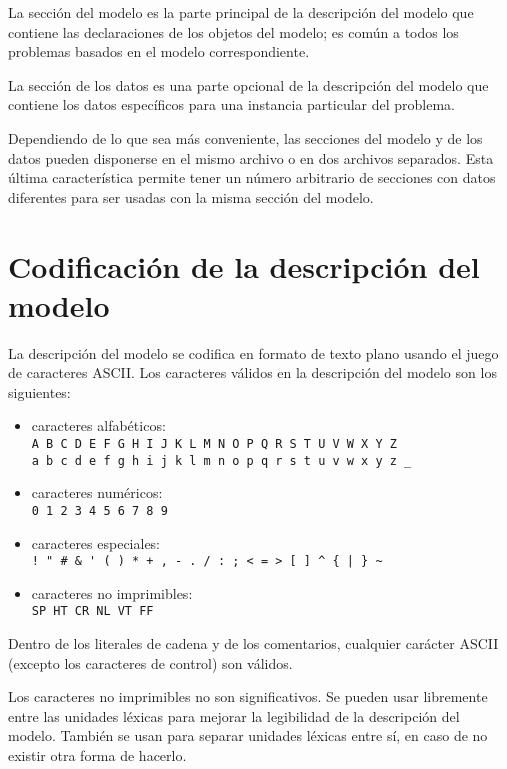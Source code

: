 \documentclass[11pt,spanish]{report}
\begin{document}
La sección del modelo es la parte principal de la descripción del modelo que contiene las declaraciones de los objetos del modelo; es común a todos los problemas basados en el modelo correspondiente.

La sección de los datos es una parte opcional de la descripción del modelo que contiene los datos específicos para una instancia particular del problema.

Dependiendo de lo que sea más conveniente, las secciones del modelo y de los datos pueden disponerse en el mismo archivo o en dos archivos separados. Esta última característica permite tener un número arbitrario de secciones con datos diferentes para ser usadas con la misma sección del modelo.


\newpage

\chapter{Codificación de la descripción del modelo}
\label{coding}

La descripción del modelo se codifica en formato de texto plano usando el juego de caracteres ASCII. Los caracteres válidos en la descripción del modelo son los siguientes:

\begin{itemize}
\item caracteres alfabéticos:\\
\verb|A B C D E F G H I J K L M N O P Q R S T U V W X Y Z|\\
\verb|a b c d e f g h i j k l m n o p q r s t u v w x y z _|
\item caracteres numéricos:\\
\verb|0 1 2 3 4 5 6 7 8 9|
\item caracteres especiales:\\
\verb?! " # & ' ( ) * + , - . / : ; < = > [ ] ^ { | } ~?
\item caracteres no imprimibles:\\
\verb|SP HT CR NL VT FF|
\end{itemize}

Dentro de los literales de cadena y de los comentarios, cualquier carácter ASCII (excepto los caracteres de control) son válidos.

Los caracteres no imprimibles no son significativos. Se pueden usar libremente entre las unidades léxicas para mejorar la legibilidad de la descripción del modelo. También se usan para separar unidades léxicas entre sí, en caso de no existir otra forma de hacerlo.
\end{document}
